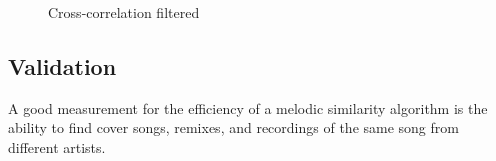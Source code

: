 \begin{figure}[htbp]
	\centering
	\caption{Cross-correlation filtered}
	\label{fig:crosscorr3}
\end{figure}
\FloatBarrier

\subsection{Validation}\label{chromavalid}
A good measurement for the efficiency of a melodic similarity algorithm is the ability to find cover songs, remixes, and recordings of the same song from different artists. 
